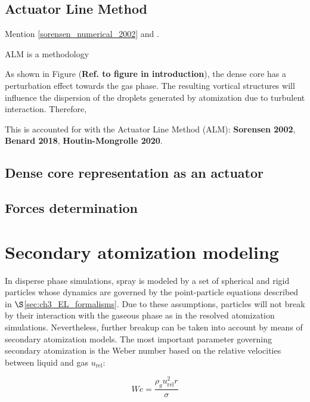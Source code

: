 \subsection{Actuator Line Method}

Mention \ref{sorensen_numerical_2002} and .

ALM is a methodology


As shown in Figure (\textbf{Ref. to figure in introduction}), the dense core has a perturbation effect towards the gas phase. The resulting vortical structures will influence the dispersion of the droplets generated by atomization due to turbulent interaction. Therefore,

 This is accounted for with the Actuator Line Method (ALM): \textbf{Sorensen 2002}, \textbf{Benard 2018}, \textbf{Houtin-Mongrolle 2020}.

\subsection{Dense core representation as an actuator}



\subsection{Forces determination}



\section{Secondary atomization modeling}
\label{sec:ch4_secondary_atomization_modeling}

In disperse phase simulations, spray is modeled by a set of spherical and rigid particles whose dynamics are governed by the point-particle equations described in $\S$\ref{sec:ch3_EL_formalisms}. Due to these assumptions, particles will not break by their interaction with the gaseous phase as in the resolved atomization simulations. Nevertheless, further breakup can be taken into account by means of secondary atomization models. The most important parameter governing secondary atomization is the Weber number based on the relative velocities between liquid and gas $u_\mathrm{rel}$:

\begin{equation}
\label{eq:We_secondary_atomization_definition}
We = \frac{\rho_g u_\mathrm{rel}^2 r}{\sigma} 
\end{equation}

